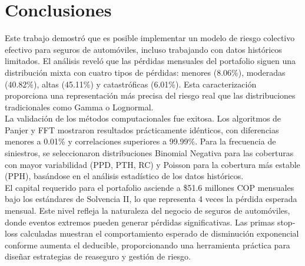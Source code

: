 \section{Conclusiones}

Este trabajo demostró que es posible implementar un modelo de riesgo colectivo efectivo para seguros de automóviles, incluso trabajando con datos históricos limitados. El análisis reveló que las pérdidas mensuales del portafolio siguen una distribución mixta con cuatro tipos de pérdidas: menores (8.06\%), moderadas (40.82\%), altas (45.11\%) y catastróficas (6.01\%). Esta caracterización proporciona una representación más precisa del riesgo real que las distribuciones tradicionales como Gamma o Lognormal.\\

La validación de los métodos computacionales fue exitosa. Los algoritmos de Panjer y FFT mostraron resultados prácticamente idénticos, con diferencias menores a 0.01\% y correlaciones superiores a 99.99\%. Para la frecuencia de siniestros, se seleccionaron distribuciones Binomial Negativa para las coberturas con mayor variabilidad (PPD, PTH, RC) y Poisson para la cobertura más estable (PPH), basándose en el análisis estadístico de los datos históricos.\\

El capital requerido para el portafolio asciende a \$51.6 millones COP mensuales bajo los estándares de Solvencia II, lo que representa 4 veces la pérdida esperada mensual. Este nivel refleja la naturaleza del negocio de seguros de automóviles, donde eventos extremos pueden generar pérdidas significativas. Las primas stop-loss calculadas muestran el comportamiento esperado de disminución exponencial conforme aumenta el deducible, proporcionando una herramienta práctica para diseñar estrategias de reaseguro y gestión de riesgo.